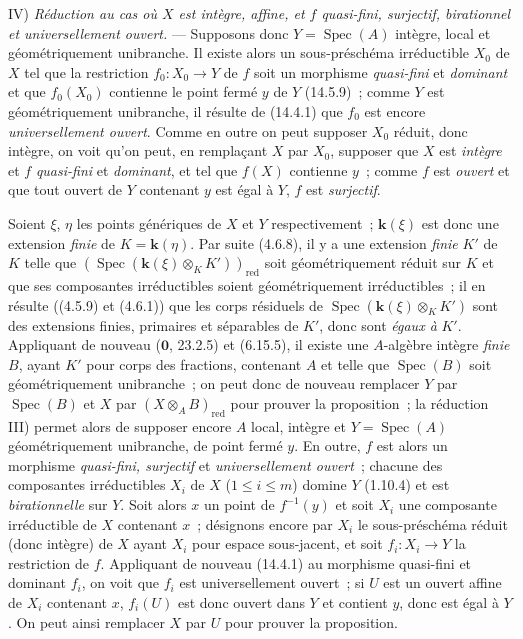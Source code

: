 IV) \emph{Réduction au cas où $X$ est intègre, affine, et $f$ quasi-fini,
surjectif, birationnel et universellement ouvert.} --- Supposons donc $Y=\operatorname{Spec}(A)$
intègre, local et géométriquement unibranche. Il existe alors un sous-préschéma
irréductible $X_0$ de $X$ tel que la restriction $f_0:X_0\to Y$ de $f$ soit un
morphisme \emph{quasi-fini} et \emph{dominant} et que $f_0(X_0)$ contienne le point fermé $y$ de
$Y$ (14.5.9)~; comme $Y$ est géométriquement unibranche, il résulte de (14.4.1) que
$f_0$ est encore \emph{universellement ouvert}. Comme en outre on peut supposer
$X_0$ réduit, donc intègre, on voit qu'on peut, en remplaçant $X$ par $X_0$,
supposer que $X$ est \emph{intègre} et $f$ \emph{quasi-fini} et \emph{dominant}, et tel que
$f(X)$ contienne $y$~; comme $f$ est \emph{ouvert} et que tout ouvert de $Y$
contenant $y$ est égal à $Y$, $f$ est \emph{surjectif}.

Soient $\xi$, $\eta$ les points génériques de $X$ et $Y$ respectivement~;
$\boldsymbol{k}(\xi)$ est donc une extension \emph{finie} de $K=\boldsymbol{k}(\eta)$. Par suite (4.6.8), il
y a une extension \emph{finie} $K'$ de $K$ telle que
$(\operatorname{Spec}(\boldsymbol{k}(\xi)\otimes_K K'))_{\mathrm{red}}$ soit géométriquement réduit sur $K$ et
que ses composantes irréductibles soient géométriquement irréductibles~; il en
résulte ((4.5.9) et (4.6.1)) que les corps résiduels de
$\operatorname{Spec}(\boldsymbol{k}(\xi)\otimes_K K')$ sont des extensions finies, primaires et séparables de
$K'$, donc sont \emph{égaux à} $K'$. Appliquant de nouveau ($\mathbf 0$, 23.2.5) et
(6.15.5), il existe une $A$-algèbre intègre \emph{finie} $B$, ayant $K'$ pour
corps des fractions, contenant $A$ et telle que $\operatorname{Spec}(B)$ soit géométriquement
unibranche~; on peut donc de nouveau remplacer $Y$ par $\operatorname{Spec}(B)$ et $X$ par
$(X\otimes_A B)_{\mathrm{red}}$ pour prouver la proposition~; la réduction III)
permet alors de supposer encore $A$ local, intègre et $Y=\operatorname{Spec}(A)$ géométriquement
unibranche, de point fermé $y$. En outre, $f$ est alors un morphisme \emph{quasi-fini,
surjectif} et \emph{universellement ouvert}~; chacune des composantes irréductibles $X_i$
de $X$ ($1\leq i\leq m$) domine $Y$ (1.10.4) et est \emph{birationnelle} sur $Y$.
Soit alors $x$ un point de $f^{-1}(y)$ et soit $X_i$ une composante irréductible de
$X$ contenant $x$~; désignons encore par $X_i$ le sous-préschéma réduit (donc
intègre) de $X$ ayant $X_i$ pour espace sous-jacent, et soit $f_i:X_i\to Y$ la
restriction de $f$. Appliquant de nouveau (14.4.1) au morphisme quasi-fini et
dominant $f_i$, on voit que $f_i$ est universellement ouvert~; si $U$ est un ouvert
affine de $X_i$ contenant $x$, $f_i(U)$ est donc
ouvert dans $Y$ et contient $y$, donc est égal à $Y$. On peut ainsi remplacer $X$
par $U$ pour prouver la proposition.

